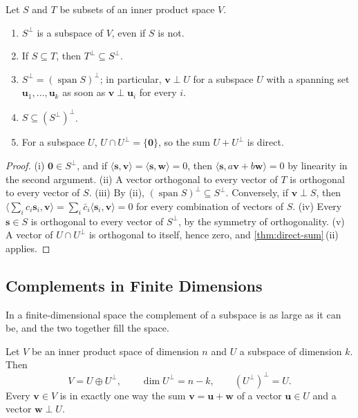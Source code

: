\begin{proposition}
\label{prop:complement-properties}
Let $S$ and $T$ be subsets of an inner product space $V$.
\begin{enumerate}
\item $S^\perp$ is a subspace of $V$, even if $S$ is not.
\item If $S\subseteq T$, then $T^\perp\subseteq S^\perp$.
\item $S^\perp=(\operatorname{span}S)^\perp$; in particular, $\mathbf v\perp U$ for a subspace $U$ with a spanning set $\mathbf u_1,\ldots,\mathbf u_k$ as soon as $\mathbf v\perp\mathbf u_i$ for every $i$.
\item $S\subseteq(S^\perp)^\perp$.
\item For a subspace $U$, $U\cap U^\perp=\{\mathbf 0\}$, so the sum $U+U^\perp$ is direct.
\end{enumerate}
\end{proposition}

\begin{proof}
(i) $\mathbf 0\in S^\perp$, and if $\langle\mathbf s,\mathbf v\rangle=\langle\mathbf s,\mathbf w\rangle=0$, then $\langle\mathbf s,a\mathbf v+b\mathbf w\rangle=0$ by linearity in the second argument. (ii) A vector orthogonal to every vector of $T$ is orthogonal to every vector of $S$. (iii) By (ii), $(\operatorname{span}S)^\perp\subseteq S^\perp$. Conversely, if $\mathbf v\perp S$, then $\langle\sum_ic_i\mathbf s_i,\mathbf v\rangle=\sum_i\bar c_i\langle\mathbf s_i,\mathbf v\rangle=0$ for every combination of vectors of $S$. (iv) Every $\mathbf s\in S$ is orthogonal to every vector of $S^\perp$, by the symmetry of orthogonality. (v) A vector of $U\cap U^\perp$ is orthogonal to itself, hence zero, and \cref{thm:direct-sum}\,(ii) applies.
\end{proof}

\subsection{Complements in Finite Dimensions}

In a finite-dimensional space the complement of a subspace is as large as it can be, and the two together fill the space.

\begin{theorem}
\label{thm:orthogonal-decomposition}
Let $V$ be an inner product space of dimension $n$ and $U$ a subspace of dimension $k$. Then
\[
V=U\oplus U^\perp,\qquad\dim U^\perp=n-k,\qquad(U^\perp)^\perp=U .
\]
Every $\mathbf v\in V$ is in exactly one way the sum $\mathbf v=\mathbf u+\mathbf w$ of a vector $\mathbf u\in U$ and a vector $\mathbf w\perp U$.
\end{theorem}

